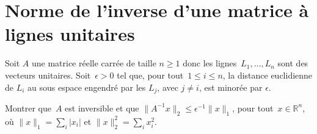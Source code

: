\section{Norme de l'inverse d'une matrice à lignes unitaires}

Soit $A$ une matrice réelle carrée de taille $n \geq 1$
donc les lignes~$L_1,\dotsc,L_n$ sont des vecteurs unitaires.
Soit~$\epsilon > 0$ tel que, pour tout~$1\leq i\leq n$, la distance euclidienne
de $L_i$ au sous espace engendré par les $L_j$, avec $j\neq i$, est minorée par $\epsilon$.

Montrer que~$A$ est inversible et que $\|A^{-1}x\|_2\leq \epsilon^{-1} \|x\|_1$, pour tout~$x\in \mathbb{R}^n$,
où $\|x\|_1=\sum_i|x_i|$ et $\|x\|_2^2=\sum_i x_i^2$.

